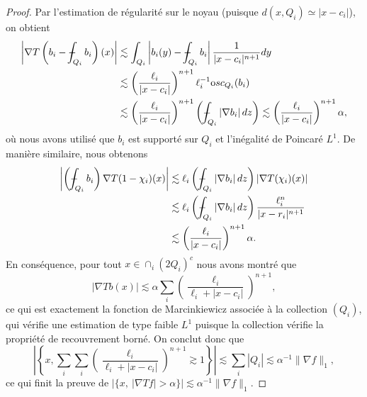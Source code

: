 \documentclass[11pt]{amsart}
\newcommand{\osc}{{\textrm osc}}
\def\Xint#1{\mathchoice
   {\XXint\displaystyle\textstyle{#1}}%
   {\XXint\textstyle\scriptstyle{#1}}%
   {\XXint\scriptstyle\scriptscriptstyle{#1}}%
   {\XXint\scriptscriptstyle\scriptscriptstyle{#1}}%
   \!\int}
\def\XXint#1#2#3{{\setbox0=\hbox{$#1{#2#3}{\int}$}
     \vcenter{\hbox{$#2#3$}}\kern-.5\wd0}}
\def\aver#1{\Xint-_{#1}}
\begin{document}
\begin{proof}
Par l'estimation de r\'egularit\'e sur le noyau (puisque $d(x,Q_i)\simeq |x-c_i|$), on obtient
\begin{align*}
\left| \nabla T \left(b_i - \aver{Q_i} b_i \right)(x) \right| & \lesssim \int_{Q_i} \left|b_i(y) - \aver{Q_i} b_i \right| \frac{1}{|x-c_i|^{n+1}} dy \\
& \lesssim \left(\frac{\ell_i}{|x-c_i|}\right)^{n+1} \ell_i^{-1}\osc_{Q_i}(b_i) \\
& \lesssim \left(\frac{\ell_i}{|x-c_i|}\right)^{n+1} \left(\aver{Q_i} |\nabla b_i| \, dz \right) \lesssim \left(\frac{\ell_i}{|x-c_i|}\right)^{n+1} \alpha,
\end{align*}
o\`u nous avons utilis\'e que $b_i$ est support\'e sur $Q_i$ et l'in\'egalit\'e de Poincar\'e $L^1$. De mani\`ere similaire, nous obtenons
\begin{align*}
\left| \left(\aver{Q_i} b_i\right) \nabla T(1-\chi_i)(x) \right| & \lesssim \ell_i \left(\aver{Q_i} |\nabla b_i| \, dz \right) \left|\nabla T(\chi_i)(x)\right| \\
& \lesssim \ell_i \left(\aver{Q_i} |\nabla b_i| \, dz \right) \frac{\ell_i^n}{|x-r_i|^{n+1}} \\
& \lesssim \left(\frac{\ell_i}{|x-c_i|}\right)^{n+1} \alpha.
\end{align*}
En cons\'equence, pour tout $x \in \cap_i (2Q_i)^c$ nous avons montr\'e que
 $$ |\nabla Tb(x)| \lesssim \alpha \sum_i  \left(\frac{\ell_i}{\ell_i + |x-c_i|}\right)^{n+1}, $$
 ce qui est exactement la fonction de Marcinkiewicz associ\'ee \`a la collection $(Q_i)$, qui v\'erifie une estimation de type faible $L^1$ puisque la collection v\'erifie la propri\'et\'e de recouvrement born\'e. On conclut donc que
$$\left| \left\{x,  \sum_i \sum_i  \left(\frac{\ell_i}{\ell_i + |x-c_i|}\right)^{n+1} \gtrsim 1\right\}\right| \lesssim \sum_i |Q_i| \lesssim \alpha^{-1}\|\nabla f\|_1,$$
 ce qui finit la preuve de $ \left| \{x,\ |\nabla Tf|>\alpha\} \right|\lesssim \alpha^{-1} \|\nabla f\|_1.$
 

\end{proof}
\end{document}
